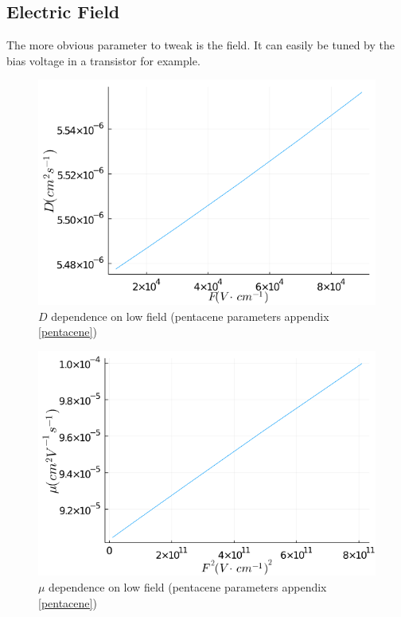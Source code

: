 \subsection{Electric Field}

The more obvious parameter to tweak is the field. It can easily be tuned by the bias voltage in a transistor for example.

\begin{figure}[!h]
    \centering
    \includegraphics*[width=.5\paperwidth]{figures/3_elec/d_field_low.png}
    \caption{$D$ dependence on low field (pentacene parameters appendix \ref{pentacene})\label{fig:3_13}}
\end{figure}

\begin{figure}[!h]
    \centering
    \includegraphics*[width=.5\paperwidth]{figures/3_elec/mobi_field_low_square.png}
    \caption{$\mu$ dependence on low field (pentacene parameters appendix \ref{pentacene})\label{fig:3_14}}
\end{figure}

